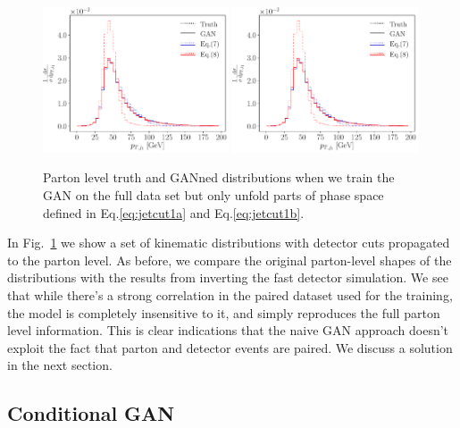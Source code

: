 \begin{figure}[t]
\centering
\includegraphics[page = 1, width=0.49\textwidth]{figures/cGAN/GAN_overlap}
\includegraphics[page = 2, width=0.49\textwidth]{figures/cGAN/GAN_overlap}
\caption{Parton level truth and GANned distributions when we train the
  GAN on the full data set but only unfold parts of phase space
  defined in Eq.\eqref{eq:jetcut1a} and Eq.\eqref{eq:jetcut1b}.}
\label{fig:distributions_GAN_sliced}
\end{figure}

In Fig.~\ref{fig:distributions_GAN_sliced} we show a set of kinematic
distributions with detector cuts propagated to the parton level. As
before, we compare the original parton-level shapes of the
distributions with the results from inverting the fast detector
simulation.  
We see that while there's a strong correlation in the paired dataset
used for the training, the model is completely insensitive to it, and 
simply reproduces the full parton level information.
This is clear indications that the naive GAN approach doesn't exploit 
the fact that parton and detector events are paired. We discuss a 
solution in the next section.

\subsection{Conditional GAN}
\label{sec:fcgan}

